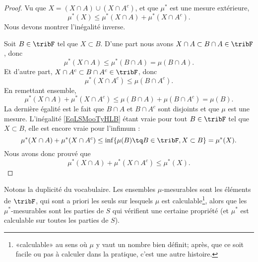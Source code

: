 \begin{proof}
    Vu que \( X=(X\cap A)\cup(X\cap A^c)\), et que \( \mu^*\) est une mesure extérieure,
    \begin{equation}
        \mu^*(X)\leq \mu^*(X\cap A)+\mu^*(X\cap A^c).
    \end{equation}
    Nous devons montrer l'inégalité inverse.

    Soit \( B\in\tribF\) tel que \( X\subset B\). D'une part nous avons \( X\cap A\subset B\cap A\in\tribF\), donc
    \begin{equation}
        \mu^*(X\cap A)\leq \mu^*(B\cap A)= \mu(B\cap A).
    \end{equation}
    Et d'autre part, \( X\cap A^c\subset B\cap A^c\in\tribF\), donc
    \begin{equation}
        \mu^*(X\cap A^c)\leq \mu(B\cap A^c).
    \end{equation}
    En remettant ensemble,
    \begin{equation}    \label{EqLSMooTyHLB}
        \mu^*(X\cap A)+\mu^*(X\cap A^c)\leq \mu(B\cap A)+\mu(B\cap A^c)=\mu(B).
    \end{equation}
    La dernière égalité est le fait que \( B\cap A\) et \( B\cap A^c\) sont disjoints et que \( \mu\) est une mesure. L'inégalité \eqref{EqLSMooTyHLB} étant vraie pour tout \( B\in \tribF\) tel que \( X\subset B\), elle est encore vraie pour l'infimum :
    \begin{equation}
        \mu^*(X\cap A)+\mu^*(X\cap A^c)\leq \inf \{ \mu(B)\tq B\in\tribF,X\subset B \}=\mu^*(X).
    \end{equation}
    Nous avons donc prouvé que
    \begin{equation}
        \mu^*(X\cap A)+\mu^*(X\cap A^c)\leq \mu^*(X).
    \end{equation}
\end{proof}

\begin{remark}
Notons la duplicité du vocabulaire. Les ensembles \( \mu\)-mesurables sont les éléments de \( \tribF\), qui sont a priori les seuls sur lesquels \( \mu\) est calculable\footnote{«calculable» au sens où \( \mu\) y vaut un nombre bien définit; après, que ce soit facile ou pas à calculer dans la pratique, c'est une autre histoire.}, alors que les \( \mu^*\)-mesurables sont les parties de \( S\) qui vérifient une certaine propriété (et \( \mu^*\) est calculable sur toutes les parties de \( S\)).
\end{remark}

